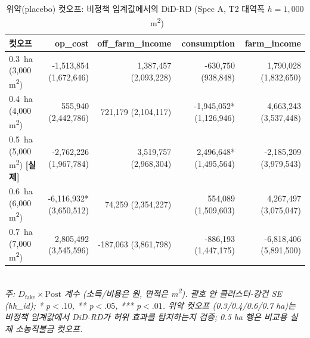 \begin{table}[ht]
\centering
\caption{위약(placebo) 컷오프: 비정책 임계값에서의 DiD-RD (Spec A, T2 대역폭 $h=1{,}000$~m\textsuperscript{2})}
\label{tab:placebo-cutoffs-ko}
\small
\begin{tabular}{lrrrr}
\toprule
컷오프 & op\_cost & off\_farm\_income & consumption & farm\_income \\
\midrule
0.3~ha (3,000 m\textsuperscript{2}) & -1,513,854 (1,672,646) & 1,387,457 (2,093,228) & -630,750 (938,848) & 1,790,028 (1,832,650) \\
0.4~ha (4,000 m\textsuperscript{2}) & 555,940 (2,442,786) & 721,179 (2,104,117) & -1,945,052* (1,126,946) & 4,663,243 (3,537,448) \\
0.5~ha (5,000 m\textsuperscript{2}) \textbf{[실제]} & -2,762,226 (1,967,784) & 3,519,757 (2,968,304) & 2,496,648* (1,495,564) & -2,185,209 (3,979,543) \\
0.6~ha (6,000 m\textsuperscript{2}) & -6,116,932* (3,650,512) & 74,259 (2,354,227) & 554,089 (1,509,603) & 4,267,497 (3,075,047) \\
0.7~ha (7,000 m\textsuperscript{2}) & 2,805,492 (3,545,596) & -187,063 (3,861,798) & -886,193 (1,447,175) & -6,818,406 (5,891,500) \\
\bottomrule
\end{tabular}
\\
\footnotesize\textit{주: $D_{\text{fake}} \times \text{Post}$ 계수 (소득/비용은 원, 면적은 m\textsuperscript{2}). 괄호 안 클러스터-강건 SE (hh\_id); * p$<.10$, ** p$<.05$, *** p$<.01$. 위약 컷오프 (0.3/0.4/0.6/0.7 ha)는 비정책 임계값에서 DiD-RD가 허위 효과를 탐지하는지 검증; 0.5 ha 행은 비교용 실제 소농직불금 컷오프.}
\end{table}


